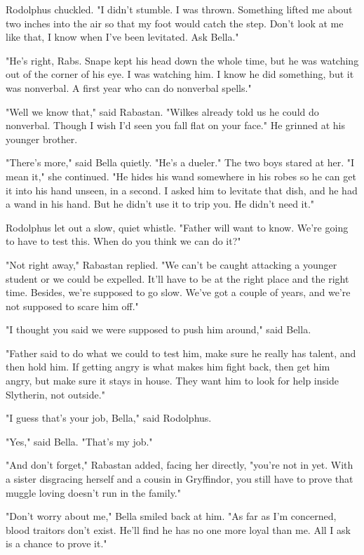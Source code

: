 \documentclass[a4paper,11pt]{article}
\begin{document}
Rodolphus chuckled. "I didn't stumble. I was thrown. Something lifted me about two inches into the air so that my foot would catch the step. Don't look at me like that, I know when I've been levitated. Ask Bella."

"He's right, Rabs. Snape kept his head down the whole time, but he was watching out of the corner of his eye. I was watching him. I know he did something, but it was nonverbal. A first year who can do nonverbal spells."

"Well we know that," said Rabastan. "Wilkes already told us he could do nonverbal. Though I wish I'd seen you fall flat on your face." He grinned at his younger brother.

"There's more," said Bella quietly. "He's a dueler." The two boys stared at her. "I mean it," she continued. "He hides his wand somewhere in his robes so he can get it into his hand unseen, in a second. I asked him to levitate that dish, and he had a wand in his hand. But he didn't use it to trip you. He didn't need it."

Rodolphus let out a slow, quiet whistle. "Father will want to know. We're going to have to test this. When do you think we can do it?"

"Not right away," Rabastan replied. "We can't be caught attacking a younger student or we could be expelled. It'll have to be at the right place and the right time. Besides, we're supposed to go slow. We've got a couple of years, and we're not supposed to scare him off."

"I thought you said we were supposed to push him around," said Bella.

"Father said to do what we could to test him, make sure he really has talent, and then hold him. If getting angry is what makes him fight back, then get him angry, but make sure it stays in house. They want him to look for help inside Slytherin, not outside."

"I guess that's your job, Bella," said Rodolphus.

"Yes," said Bella. "That's my job."

"And don't forget," Rabastan added, facing her directly, "you're not in yet. With a sister disgracing herself and a cousin in Gryffindor, you still have to prove that muggle loving doesn't run in the family."

"Don't worry about me," Bella smiled back at him. "As far as I'm concerned, blood traitors don't exist. He'll find he has no one more loyal than me. All I ask is a chance to prove it."
\end{document}
